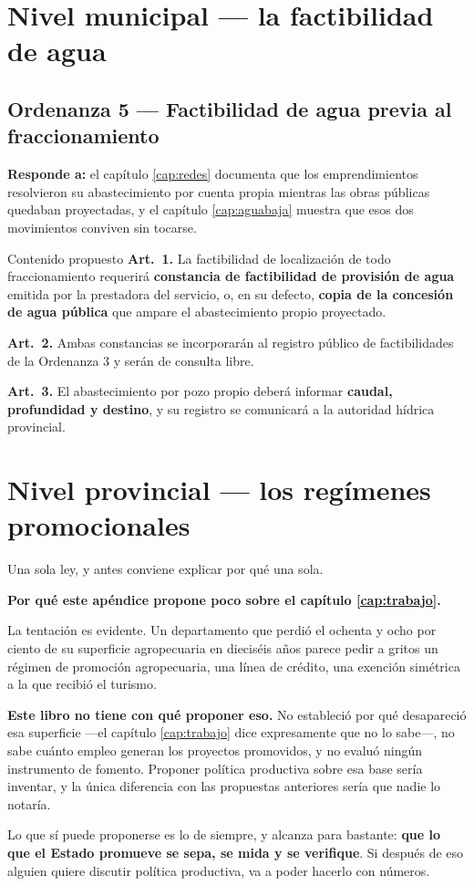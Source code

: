 \section{Nivel municipal --- la factibilidad de agua}

\subsection{Ordenanza 5 --- Factibilidad de agua previa al fraccionamiento}

\textbf{Responde a:} el capítulo \ref{cap:redes} documenta que los emprendimientos resolvieron
su abastecimiento por cuenta propia mientras las obras públicas quedaban proyectadas, y el
capítulo \ref{cap:aguabaja} muestra que esos dos movimientos conviven sin tocarse.

\begin{ficha}{Contenido propuesto}
\textbf{Art.\ 1.} La factibilidad de localización de todo fraccionamiento requerirá
\textbf{constancia de factibilidad de provisión de agua} emitida por la prestadora del
servicio, o, en su defecto, \textbf{copia de la concesión de agua pública} que ampare el
abastecimiento propio proyectado.

\textbf{Art.\ 2.} Ambas constancias se incorporarán al registro público de factibilidades de
la Ordenanza 3 y serán de consulta libre.

\textbf{Art.\ 3.} El abastecimiento por pozo propio deberá informar \textbf{caudal, profundidad
y destino}, y su registro se comunicará a la autoridad hídrica provincial.
\end{ficha}

\section{Nivel provincial --- los regímenes promocionales}

Una sola ley, y antes conviene explicar por qué una sola.

\begin{cautela}
\textbf{Por qué este apéndice propone poco sobre el capítulo \ref{cap:trabajo}.}

La tentación es evidente. Un departamento que perdió el ochenta y ocho por ciento de su
superficie agropecuaria en dieciséis años parece pedir a gritos un régimen de promoción
agropecuaria, una línea de crédito, una exención simétrica a la que recibió el turismo.

\textbf{Este libro no tiene con qué proponer eso.} No estableció por qué desapareció esa
superficie ---el capítulo \ref{cap:trabajo} dice expresamente que no lo sabe---, no sabe
cuánto empleo generan los proyectos promovidos, y no evaluó ningún instrumento de fomento. Proponer política
productiva sobre esa base sería inventar, y la única diferencia con las propuestas anteriores
sería que nadie lo notaría.

Lo que sí puede proponerse es lo de siempre, y alcanza para bastante: \textbf{que lo que el
Estado promueve se sepa, se mida y se verifique}. Si después de eso alguien quiere discutir
política productiva, va a poder hacerlo con números.
\end{cautela}

